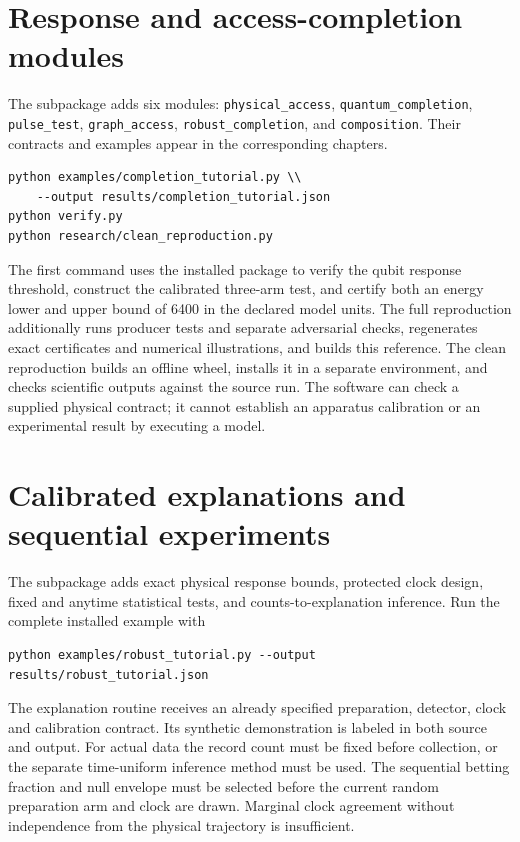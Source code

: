 \section{Response and access-completion modules}
The  subpackage adds six modules:
\texttt{physical\_access}, \texttt{quantum\_completion},
\texttt{pulse\_test}, \texttt{graph\_access},
\texttt{robust\_completion}, and \texttt{composition}.
Their contracts and examples appear in the corresponding chapters.
\begin{verbatim}
python examples/completion_tutorial.py \\
    --output results/completion_tutorial.json
python verify.py
python research/clean_reproduction.py
\end{verbatim}
The first command uses the installed package to verify the qubit response
threshold, construct the calibrated three-arm test, and certify both an
energy lower and upper bound of 6400 in the declared model units. The full
reproduction additionally runs producer tests and separate adversarial checks,
regenerates exact certificates and numerical illustrations, and builds this
reference. The clean reproduction builds an offline wheel, installs it in a
separate environment, and checks scientific outputs against the source run.
The software can check a supplied physical contract; it cannot establish an
apparatus calibration or an experimental result by executing a model.

\section{Calibrated explanations and sequential experiments}
The  subpackage adds exact physical response
bounds, protected clock design, fixed and anytime statistical tests, and
counts-to-explanation inference. Run the complete installed example with
\begin{verbatim}
python examples/robust_tutorial.py --output results/robust_tutorial.json
\end{verbatim}
The explanation routine receives an already specified preparation, detector,
clock and calibration contract. Its synthetic demonstration is labeled in both
source and output. For actual data the record count must be fixed before
collection, or the separate time-uniform inference method must be used.
The sequential betting fraction and null envelope must be selected before the
current random preparation arm and clock are drawn. Marginal clock agreement
without independence from the physical trajectory is insufficient.

